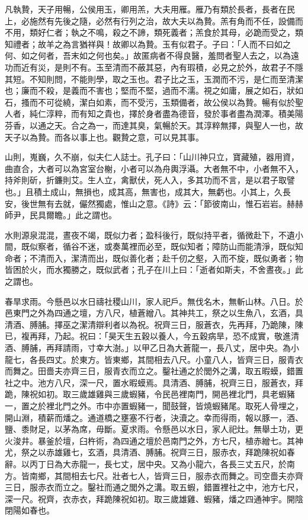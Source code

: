 凡執贄，天子用暢，公侯用玉，卿用羔，大夫用雁。雁乃有類於長者，長者在民上，必施然有先後之隨，必然有行列之治，故大夫以為贄。羔有角而不任，設備而不用，類好仁者；執之不鳴，殺之不諦，類死義者；羔食於其母，必跪而受之，類知禮者；故羊之為言猶祥與！故卿以為贄。玉有似君子。子曰：「人而不曰如之何、如之何者，吾末如之何也矣。」故匿病者不得良醫，羞問者聖人去之，以為遠功而近有災，是則不有。玉至清而不蔽其惡，內有瑕積，必見之於外，故君子不隱其短。不知則問，不能則學，取之玉也。君子比之玉，玉潤而不污，是仁而至清潔也；廉而不殺，是義而不害也；堅而不堅，過而不濡。視之如庸，展之如石，狀如石，搔而不可從繞，潔白如素，而不受污，玉類備者，故公侯以為贄。暢有似於聖人者，純仁淳粹，而有知之貴也，擇於身者盡為德音，發於事者盡為潤澤。積美陽芬香，以通之天。合之為一，而達其臭，氣暢於天。其淳粹無擇，與聖人一也，故天子以為贄。而各以事上也。觀贄之意，可以見其事。


山則，嵬巍，久不崩，似夫仁人誌士。孔子曰：「山川神只立，寶藏殖，器用資，曲直合，大者可以為宮室台榭，小者可以為舟輿浮灄。大者無不中，小者無不入，持斧則斫，折鐮則艾。生人立，禽獸伏，死人入，多其功而不言，是以君子取譬也。」且積土成山，無損也，成其高，無害也，成其大，無虧也。小其上，久長安，後世無有去就，儼然獨處，惟山之意。《詩》云：「節彼南山，惟石岩岩。赫赫師尹，民具爾瞻。」此之謂也。

水則源泉混混，晝夜不竭，既似力者；盈科後行，既似持平者，循微赴下，不遺小間，既似察者，循谷不迷，或奏萬裡而必至，既似知者；障防山而能清淨，既似知命者；不清而入，潔清而出，既似善化者；赴千仞之壑，入而不旋，既似勇者；物皆困於火，而水獨勝之，既似武者；孔子在川上曰：「逝者如斯夫，不舍晝夜。」此之謂也。


春旱求雨。今懸邑以水日禱社稷山川，家人祀戶。無伐名木，無斬山林。八日。於邑東門之外為四通之壇，方八尺，植蒼繒八。其神共工，祭之以生魚八，玄酒，具清酒、膊脯。擇巫之潔清辯利者以為祝。祝齊三日，服蒼衣，先再拜，乃跪陳，陳已，複再拜，乃起。祝曰：「昊天生五穀以養人，今五穀病旱，恐不成實，敬進清酒、膊脯，再拜請雨，寸幸大澍。」以甲乙日為大蒼龍一，長八丈，居中央。為小龍七，各長四丈。於東方。皆東鄉，其間相去八尺。小童八人，皆齊三日，服青衣而舞之。田嗇夫亦齊三日，服青衣而立之。鑿社通之於閭外之溝，取五暇蟆，錯置社之中。池方八尺，深一尺，置水暇蟆焉。具清酒、膊脯，祝齊三日，服蒼衣，拜跪，陳祝如初。取三歲雄雞與三歲蝦豬，令民邑裡南門，開邑裡北門，具老蝦豬一，置之於裡北門之外。市中亦置蝦豬一，聞鼓聲，皆燒蝦豬尾。取死人骨埋之，開山淵，積薪而燔之。通道橋之壅塞不行者，決瀆之。幸而得雨，報以豚一，酒、鹽、黍財足，以茅為席，毋斷。夏求雨。令懸邑以水日，家人祀灶。無舉土功，更火浚井。暴釜於壇，臼杵術，為四通之壇於邑南門之外，方七尺，植赤繒七。其神尤，祭之以赤雄雞七，玄酒，具清酒、膊脯。祝齊三日，服赤衣，拜跪陳祝如春辭。以丙丁日為大赤龍一，長七丈，居中央。又為小龍六，各長三丈五尺，於南方。皆南鄉，其間相去七尺。壯者七人，皆齊三日，服赤衣而舞之。司空嗇夫亦齊三日，服赤衣而立之。鑿社而通之閭外之溝。取五蝦，錯置裡社之中，池方七尺，深一尺。祝齊，衣赤衣，拜跪陳祝如初。取三歲雄雞、蝦豬，燔之四通神宇。開陰閉陽如春也。


